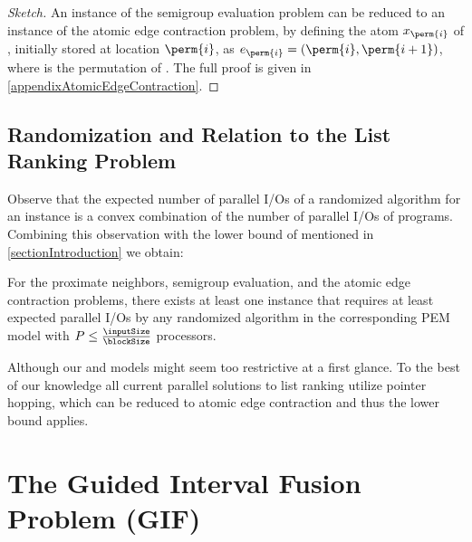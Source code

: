 \documentclass[envcountsame]{llncs}
\def\bOm#1{\printmath{\Omega \left(#1\right)}}
\begin{document}


\begin{proof}[Sketch]
An instance \instSE of the semigroup evaluation problem can be reduced to an instance \instanceAtomicListRanking of the atomic edge contraction problem, by defining the atom $x_{\perm{i}}$ of \instanceAtomicListRanking, initially stored at location $\perm{i}$, as \mbox{$e_{\perm{i}}=(\perm{i},\perm{i+1})$}, where \perm{} is the permutation of \instSE. 
The full proof is given in \autoref{appendixAtomicEdgeContraction}.
\end{proof}

 


\subsection{Randomization and Relation to the List Ranking Problem}
Observe that the expected number of parallel I/Os of a randomized algorithm for an instance is a convex combination of the number of parallel I/Os of programs. 
Combining this observation with the \bOm{\log P} lower bound of \cite{1990KarpRamachandranPRAMListRankLB,2008ArgeEtAlFundamentalPEM} mentioned in \autoref{sectionIntroduction} we obtain:

\begin{theorem}
For the proximate neighbors, semigroup evaluation, and the atomic edge contraction problems, there exists at least one instance that requires at least \bOm{\permp{\inputSize,\memorySize,\blockSize} + \log P} expected parallel I/Os by any randomized algorithm in the corresponding PEM model with $P\leq\frac{\inputSize}{\blockSize}$ processors. 
\end{theorem}



Although our \semigroupPEM and \bridgingPEM models might seem too restrictive at a first glance.
To the best of our knowledge all current parallel solutions to list ranking utilize pointer hopping, which can be reduced to atomic edge contraction and thus the lower bound applies. 










\section{The Guided Interval Fusion Problem (GIF)}
\end{document}

